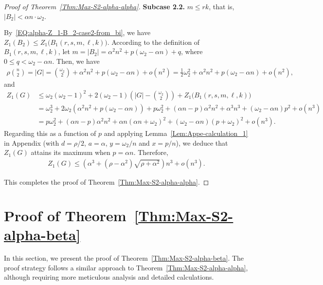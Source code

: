 \documentclass[11pt,a4paper]{article}
\begin{document}
\begin{proof}[Proof of Theorem~\ref{Thm:Max-S2-alpha-alpha}]
\textbf{Subcase 2.2. } $m \le rk$, that is, $|B_2| < \alpha n \cdot \omega_2$. 

By~\eqref{EQ:alpha-Z_1-B_2-case2-from_bi}, we have $Z_{1}(B_2) \le  Z_{1}\big(B_1(r,s,m,\ell,k) \big)$. 
According to the definition of $B_1(r,s,m,\ell,k)$, let $m = |B_2| = \alpha^2 n^2 + p(\omega_2 - \alpha n) +q$, where $0 \le q < \omega_2 - \alpha n$. 
Then, we have 
\begin{align*}
\rho \binom{n}{2} 
= |G| 
= \binom{\omega_2}{2} + \alpha^2 n^2 + p(\omega_2 - \alpha n) + o(n^2) 
= \frac{1}{2} \omega_2^2 + \alpha^2 n^2 + p(\omega_2 - \alpha n) + o(n^2), 
\end{align*}
and 
\begin{align*}
Z_{1}(G) 
&\le \omega_2 (\omega_2 -1)^2 + 2(\omega_2 -1) \left(|G| - \binom{\omega_2}{2}\right) + Z_{1}\big(B_1(r,s,m,\ell,k) \big) \\ 
&= \omega_2 ^3 + 2 \omega_2 \left(\alpha^2 n^2 + p(\omega_2 - \alpha n)\right)+p \omega_2^2 + (\alpha n -p) \alpha^2n^2 + \alpha^3 n^3 + (\omega_2 - \alpha n) p^2 + o(n^3) \\
& = p \omega_2^2 + (\alpha n - p) \alpha^2 n^2 + \alpha n (\alpha n+ \omega_2)^2 + (\omega_2 - \alpha n) (p + \omega_2)^2 + o(n^3). 
\end{align*}
Regarding this as a function of $p$ and applying Lemma~\ref{Lem:Appe-calculation_1} in Appendix (with $d = \rho/2$, $a = \alpha$, $y = \omega_2/n$ and $x = p/n$), we deduce that $Z_{1}(G)$ attains its maximum when $p = \alpha n$. 
Therefore, 
\begin{align*}
Z_{1}(G) 
\le \left(\alpha^3+(\rho-\alpha^2)\sqrt{\rho+\alpha^2}\right) n^3 + o(n^3).
\end{align*}

This completes the proof of Theorem~\ref{Thm:Max-S2-alpha-alpha}. 
\end{proof}

\section{Proof of Theorem~\ref{Thm:Max-S2-alpha-beta}}\label{Sec:note-general-graph-alpha-beta}

In this section, we present the proof of Theorem~\ref{Thm:Max-S2-alpha-beta}. 
The proof strategy follows a similar approach to Theorem~\ref{Thm:Max-S2-alpha-alpha}, although requiring more meticulous analysis and detailed calculations. 
\end{document}
